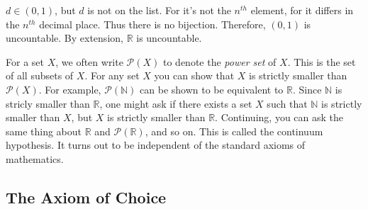             $d\in(0,1)$, but $d$ is not on the list. For it's not
            the $n^{th}$ element, for it differs in the
            $n^{th}$ decimal place. Thus there is no bijection.
            Therefore, $(0,1)$ is uncountable. By extension,
            $\mathbb{R}$ is uncountable.
            \par\hfill\par
            \vspace{-2ex}
            For a set $X$, we often write
            $\mathcal{P}(X)$ to denote the
            \textit{power set} of $X$. This is the
            set of all subsets of $X$.
            For any set $X$ you can show that $X$ is
            strictly smaller than $\mathcal{P}(X)$.
            For example, $\mathcal{P}(\mathbb{N})$
            can be shown to be equivalent to $\mathbb{R}$.
            Since $\mathbb{N}$ is stricly smaller than
            $\mathbb{R}$, one might ask if there exists
            a set $X$ such that $\mathbb{N}$ is strictly
            smaller than $X$, but $X$ is strictly smaller
            than $\mathbb{R}$. Continuing, you can ask the
            same thing about $\mathbb{R}$ and
            $\mathcal{P}(\mathbb{R})$, and so on.
            This is called the continuum hypothesis.
            It turns out to be independent of
            the standard axioms of mathematics.
        \subsection{The Axiom of Choice}
